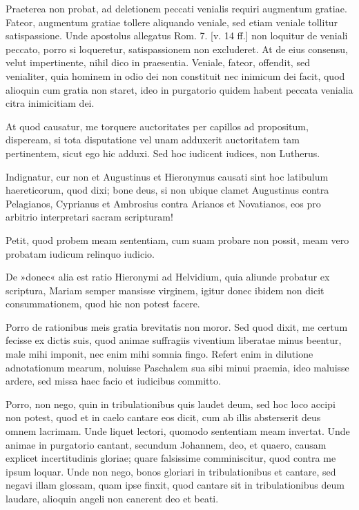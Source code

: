 Praeterea non probat, ad deletionem peccati venialis requiri augmentum gratiae. Fateor, augmentum gratiae tollere aliquando veniale, sed etiam veniale tollitur satispassione. Unde apostolus allegatus Rom. 7. [v. 14 ff.] non loquitur de veniali peccato, porro si loqueretur, satispassionem non excluderet. At de eius consensu, velut impertinente, nihil dico in praesentia. Veniale, fateor, offendit, sed venialiter, quia hominem in odio dei non constituit nec inimicum dei facit, quod alioquin cum gratia non staret, ideo in purgatorio quidem habent peccata venialia citra inimicitiam dei.

At quod causatur, me torquere auctoritates per capillos ad propositum, dispeream, si tota disputatione vel unam adduxerit auctoritatem tam pertinentem, sicut ego hic adduxi. Sed hoc iudicent iudices, non Lutherus.

Indignatur, cur non et Augustinus et Hieronymus causati sint hoc latibulum haereticorum, quod dixi; bone deus, si non ubique clamet Augustinus contra Pelagianos, Cyprianus et Ambrosius contra Arianos et Novatianos, eos pro arbitrio interpretari sacram scripturam!

Petit, quod probem meam sententiam, cum suam probare non possit, meam vero probatam iudicum relinquo iudicio.

De »donec« alia est ratio Hieronymi ad Helvidium, quia aliunde probatur ex scriptura, Mariam semper mansisse virginem, igitur donec ibidem non dicit consummationem, quod hic non potest facere.

Porro de rationibus meis gratia brevitatis non moror. Sed quod dixit, me certum fecisse ex dictis suis, quod animae suffragiis viventium liberatae minus beentur, male mihi imponit, nec enim mihi somnia fingo. Refert enim in dilutione adnotationum mearum, noluisse Paschalem sua sibi minui praemia, ideo maluisse ardere, sed missa haec facio et iudicibus committo.

Porro, non nego, quin in tribulationibus quis laudet deum, sed hoc loco accipi non potest, quod et in caelo cantare eos dicit, cum ab illis absterserit deus omnem lacrimam. Unde liquet lectori, quomodo sententiam meam invertat. Unde animae in purgatorio cantant, secundum Johannem, deo, et quaero, causam explicet incertitudinis gloriae; quare falsissime comminiscitur, quod contra me ipsum loquar. Unde non nego, bonos gloriari in tribulationibus et cantare, sed negavi illam glossam, quam ipse finxit, quod \marginpar{\small[344]} cantare sit in tribulationibus deum laudare, alioquin angeli non canerent deo et beati.


